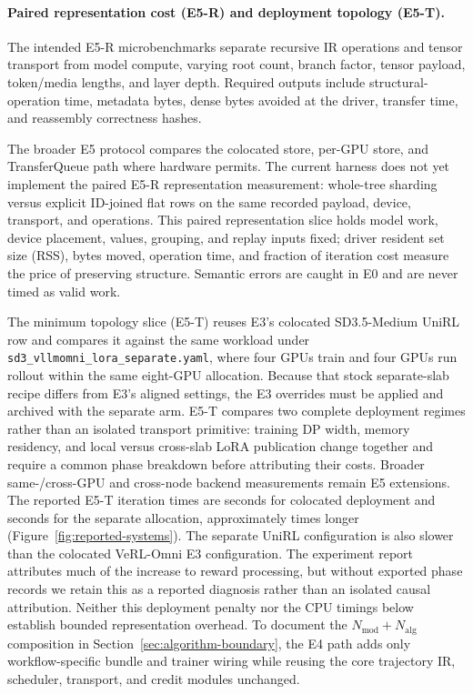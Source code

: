 \documentclass[10pt]{article}
\newcommand{\codepath}[1]{\texttt{#1}}
\begin{document}
\paragraph{Paired representation cost (E5-R) and deployment topology (E5-T).}
The intended E5-R microbenchmarks separate recursive IR operations and tensor transport from model compute, varying root count, branch factor, tensor payload, token/media lengths, and layer depth.
Required outputs include structural-operation time, metadata bytes, dense bytes avoided at the driver, transfer time, and reassembly correctness hashes.

The broader E5 protocol compares the colocated store, per-GPU store, and TransferQueue path where hardware permits.
The current harness does not yet implement the paired E5-R representation measurement: whole-tree sharding versus explicit ID-joined flat rows on the same recorded payload, device, transport, and operations.
This paired representation slice holds model work, device placement, values, grouping, and replay inputs fixed; driver resident set size (RSS), bytes moved, operation time, and fraction of iteration cost measure the price of preserving structure.
Semantic errors are caught in E0 and are never timed as valid work.

The minimum topology slice (E5-T) reuses E3's colocated SD3.5-Medium UniRL row and compares it against the same workload under \codepath{sd3\_vllmomni\_lora\_separate.yaml}, where four GPUs train and four GPUs run rollout within the same eight-GPU allocation.
Because that stock separate-slab recipe differs from E3's aligned settings, the E3 overrides must be applied and archived with the separate arm.
E5-T compares two complete deployment regimes rather than an isolated transport primitive: training DP width, memory residency, and local versus cross-slab LoRA publication change together and require a common phase breakdown before attributing their costs.
Broader same-/cross-GPU and cross-node backend measurements remain E5 extensions.
The reported E5-T iteration times are \ReportedColocatedSeconds{} seconds for colocated deployment and \ReportedSeparateSeconds{} seconds for the separate allocation, approximately \ReportedTopologySlowdown{} times longer (Figure~\ref{fig:reported-systems}).
The separate UniRL configuration is also slower than the colocated VeRL-Omni E3 configuration.
The experiment report attributes much of the increase to reward processing, but without exported phase records we retain this as a reported diagnosis rather than an isolated causal attribution.
Neither this deployment penalty nor the CPU timings below establish bounded representation overhead.
To document the $N_{\mathrm{mod}}+N_{\mathrm{alg}}$ composition in Section~\ref{sec:algorithm-boundary}, the E4 path adds only workflow-specific bundle and trainer wiring while reusing the core trajectory IR, scheduler, transport, and credit modules unchanged.
\end{document}
